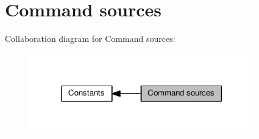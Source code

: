 \hypertarget{group__IL__CONST__CMD__SRC}{}\section{Command sources}
\label{group__IL__CONST__CMD__SRC}
Collaboration diagram for Command sources\+:\nopagebreak
\begin{figure}[H]
\begin{center}
\leavevmode
\includegraphics[width=277pt]{group__IL__CONST__CMD__SRC}
\end{center}
\end{figure}
